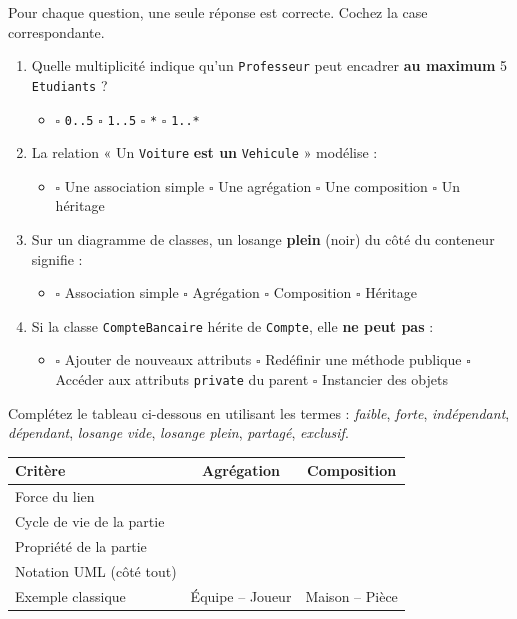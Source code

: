 \documentclass[11pt]{article}
\begin{document}
\begin{exercice}
Pour chaque question, une seule réponse est correcte. Cochez la case correspondante.
\begin{enumerate}
    \item Quelle multiplicité indique qu'un \texttt{Professeur} peut encadrer \textbf{au maximum} 5 \texttt{Etudiants} ?
    \begin{itemize}
        \item $\square$ \texttt{0..5} \quad $\square$ \texttt{1..5} \quad $\square$ \texttt{*} \quad $\square$ \texttt{1..*}
    \end{itemize}
    \item La relation « Un \texttt{Voiture} \textbf{est un} \texttt{Vehicule} » modélise :
    \begin{itemize}
        \item $\square$ Une association simple \quad $\square$ Une agrégation \quad $\square$ Une composition \quad $\square$ Un héritage
    \end{itemize}
    \item Sur un diagramme de classes, un losange \textbf{plein} (noir) du côté du conteneur signifie :
    \begin{itemize}
        \item $\square$ Association simple \quad $\square$ Agrégation \quad $\square$ Composition \quad $\square$ Héritage
    \end{itemize}
    \item Si la classe \texttt{CompteBancaire} hérite de \texttt{Compte}, elle \textbf{ne peut pas} :
    \begin{itemize}
        \item $\square$ Ajouter de nouveaux attributs \quad $\square$ Redéfinir une méthode publique \quad $\square$ Accéder aux attributs \texttt{private} du parent \quad $\square$ Instancier des objets
    \end{itemize}
\end{enumerate}
\end{exercice}

\begin{exercice}
Complétez le tableau ci-dessous en utilisant les termes : \textit{faible}, \textit{forte}, \textit{indépendant}, \textit{dépendant}, \textit{losange vide}, \textit{losange plein}, \textit{partagé}, \textit{exclusif}.
\begin{center}
\begin{tabular}{|l|c|c|}
\hline
\textbf{Critère} & \textbf{Agrégation} & \textbf{Composition} \\
\hline
Force du lien & & \\
\hline
Cycle de vie de la partie & & \\
\hline
Propriété de la partie & & \\
\hline
Notation UML (côté tout) & & \\
\hline
Exemple classique & Équipe -- Joueur & Maison -- Pièce \\
\hline
\end{tabular}
\end{center}
\end{exercice}
\end{document}
